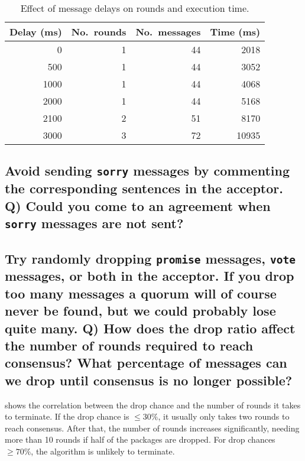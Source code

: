 \documentclass[a4paper, 10pt]{article}
\begin{document}
\begin{table}[htp]
\centering
\caption{Effect of message delays on rounds and execution time.}
\label{tab:delays}
\begin{tabular}{rrrr}
\toprule
Delay (ms)\! & No.~rounds & No.~messages & Time (ms)\! \\ \midrule
0            & 1          & 44           & 2018        \\
500          & 1          & 44           & 3052        \\
1000         & 1          & 44           & 4068        \\
2000         & 1          & 44           & 5168        \\
2100         & 2          & 51           & 8170        \\
3000         & 3          & 72           & 10935       \\ \bottomrule
\end{tabular}
\end{table}

\subsection{Avoid sending \texttt{sorry} messages by commenting the corresponding sentences in the acceptor. Q) Could you come to an agreement when \texttt{sorry} messages are not sent?}

\subsection{\!Try randomly dropping \texttt{promise} messages, \texttt{vote} messages, or both in the acceptor. If you drop too many messages a quorum will of course never be found, but we could probably lose quite many. Q) How does the drop ratio affect the number of rounds required to reach consensus? What percentage of messages can we drop until consensus is no longer possible?}

 shows the correlation between the drop chance and the number of rounds it takes to terminate.
If the drop chance is \(\leq 30\%\), it usually only takes two rounds to reach consensus.
After that, the number of rounds increases significantly, needing more than 10 rounds if half of the packages are dropped.
For drop chances \(\geq 70\%\), the algorithm is unlikely to terminate.
\end{document}
